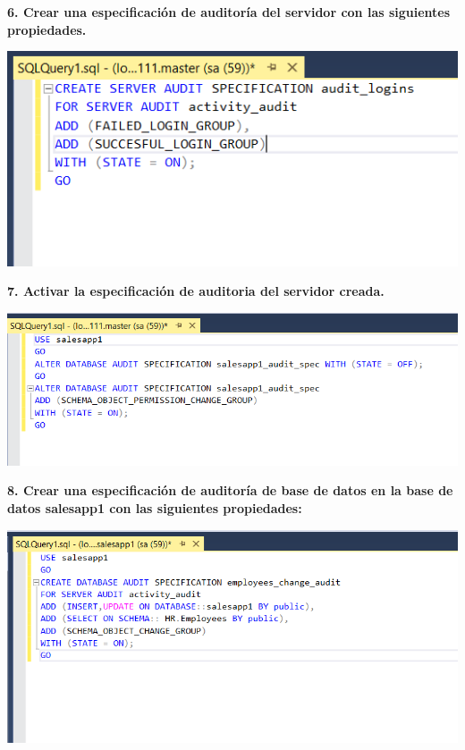\documentclass{article}
\begin{document}
\textbf{6. Crear una especificación de auditoría del servidor con las siguientes propiedades.}

    \begin{center}
		\includegraphics[width=15cm]{./images/10} 
	\end{center}
	
\newpage
\textbf{7.  Activar la especificación de auditoria del servidor creada.}

    \begin{center}
		\includegraphics[width=15cm]{./images/11} 
	\end{center}
\textbf{8. Crear una especificación de auditoría de base de datos en la base de datos salesapp1 con las siguientes propiedades:}

    \begin{center}
		\includegraphics[width=15cm]{./images/12} 
	\end{center}
\end{document}
